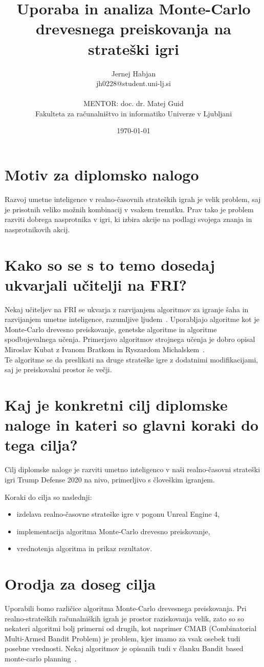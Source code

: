 \documentclass[11pt,a4paper]{article}
\title{Uporaba in analiza Monte-Carlo drevesnega preiskovanja na strateški igri}
\author{Jernej Habjan\\
jh0228@student.uni-lj.si\\
\ \\
MENTOR: doc. dr. Matej Guid \\
Fakulteta za računalništvo in informatiko Univerze v Ljubljani
\date{\today}         
}
\begin{document}
\maketitle

\section{Motiv za diplomsko nalogo}

Razvoj umetne inteligence v realno-časovnih strateških igrah je velik problem, saj je prisotnih veliko možnih kombinacij v vsakem trenutku. Prav tako je problem razviti dobrega nasprotnika v igri, ki izbira akcije na podlagi svojega znanja in nasprotnikovih akcij.

\section{Kako so se s to temo dosedaj ukvarjali učitelji na FRI?}
Nekaj učiteljev na FRI se ukvarja z razvijanjem algoritmov za igranje šaha in razvijanjem umetne inteligence, razumljive ljudem~\cite{mozina2008fighting}.
Uporabljajo algoritme kot je Monte-Carlo drevesno preiskovanje, genetske algoritme in algoritme spodbujevalnega učenja. Primerjavo algoritmov strojnega učenja je dobro opisal Miroslav Kubat z Ivanom Bratkom in Ryszardom Michalskem~\cite{kubat1998review}.\\
Te algoritme se da preslikati na druge strateške igre z dodatnimi modifikacijami, saj je preiskovalni prostor še večji.

\section{Kaj je konkretni cilj diplomske naloge in kateri so glavni koraki do tega cilja?}

Cilj diplomske naloge je razviti umetno inteligenco v naši realno-časovni strateški igri Trump Defense 2020 na nivo, primerljivo s človeškim igranjem.

Koraki do cilja so naslednji:
\begin{itemize}
	\item izdelava realno-časovne strateške igre v pogonu Unreal Engine 4,
	\item implementacija algoritma Monte-Carlo drevesno preiskovanje,
	\item vrednotenja algoritma in prikaz rezultatov.
\end{itemize}

\section{Orodja za doseg cilja}
Uporabili bomo različice algoritma Monte-Carlo drevesnega preiskovanja. 
Pri realno-strateških računalniških igrah je prostor raziskovanja velik, zato so so nekateri algoritmi bolj primerni od drugih, kot naprimer CMAB (Combinatorial Multi-Armed Bandit Problem) je problem, kjer imamo za vsak osebek tudi posebne vrednosti. 
Nekaj algoritmov je opisanih tudi v članku Bandit based monte-carlo planning~\cite{kocsis2006bandit}.
\end{document}
